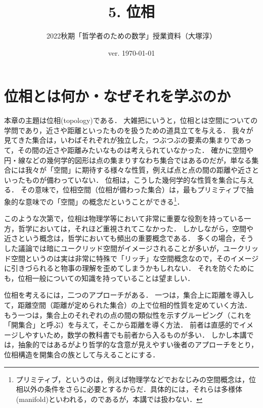 \documentclass[11pt,a4paper]{jsarticle}
\begin{document}
\title{5. 位相}
\author{2022秋期「哲学者のための数学」授業資料（大塚淳）}
\date{ver. \today}
\maketitle

\section{位相とは何か・なぜそれを学ぶのか}

本章の主題は位相(topology)である．
大雑把にいうと，位相とは空間についての学問であり，近さや距離といったものを扱うための道具立てを与える．
我々が見てきた集合は，いわばそれぞれが独立した，つぶつぶの要素の集まりであって，その間の近さや距離みたいなものは考えられていなかった．
確かに空間や円・線などの幾何学的図形は点の集まりすなわち集合ではあるのだが，単なる集合には我々が「空間」に期待する様々な性質，例えば点と点の間の距離や近さといったものが備わっていない．
位相は，こうした幾何学的な性質を集合に与える．
その意味で，位相空間（位相が備わった集合）は，最もプリミティブで抽象的な意味での「空間」の概念だということができる\footnote{プリミティブ，というのは，例えば物理学などでおなじみの空間概念は，位相以外の条件をさらに必要とするからだ．具体的には，それらは多様体(manifold)といわれる，のであるが，本講では扱わない．}．

このような次第で，位相は物理学等において非常に重要な役割を持っている一方，哲学においては，それほど重視されてこなかった．
しかしながら，空間や近さという概念は，哲学においても頻出の重要概念である．
多くの場合，そうした議論では暗にユークリッド空間がイメージされることが多いが，ユークリッド空間というのは実は非常に特殊で「リッチ」な空間概念なので，そのイメージに引きづられると物事の理解を歪めてしまうかもしれない．
それを防ぐためにも，位相一般についての知識を持っていることは望ましい．

位相を考えるには，二つのアプローチがある．
一つは，集合上に距離を導入して，距離空間（距離が定められた集合）の上で位相的性質を定めていく方法．
もう一つは，集合上のそれぞれの点の間の類似性を示すグルーピング（これを「開集合」と呼ぶ）を与えて，そこから距離を導く方法．
前者は直感的でイメージしやすいため，数学の教科書でも前者から入るものが多い．
しかし本講では，抽象的ではあるがより哲学的な含意が見えやすい後者のアプローチをとり，位相構造を開集合の族として与えることにする．

\end{document}
